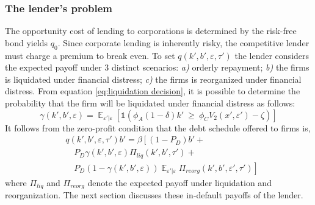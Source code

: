 \documentclass[12pt]{article}
\DeclareMathOperator{\E}{\mathbb{E}}
\begin{document}
\subsubsection{The lender's problem}
The opportunity cost of lending to corporations is determined by the risk-free bond yields $q_0$. Since corporate lending is inherently risky, the competitive lender must charge a premium to break even. To set $q(k',b',\varepsilon, \tau')$ the lender considers the expected payoff under 3 distinct scenarios: \textit{a)} orderly repayment; \textit{b)} the firms is liquidated under financial distress; \textit{c)} the firms is reorganized under financial distress. From equation \ref{eq:liquidation decision}, it is possible to determine the probability that the firm will be liquidated under financial distress as follows: 
\begin{equation} \label{eq:liquidation probability}
    \gamma(k',b',\varepsilon) = \E_{\varepsilon'|\varepsilon}[\mathds{1}(\phi_A (1-\delta) k'  \  \geq \ \phi_C V_2(x',\varepsilon')- \zeta)]  
\end{equation}
It follows from the zero-profit condition that the debt schedule offered to firms is,
\begin{equation} \label{eq:q}
    \begin{split}
        & q(k',b', \varepsilon, \tau')b' =  \beta \left[ (1-P_D)b' + \right. \\
        & \quad P_D \gamma(k',b',\varepsilon) \Pi_{liq}(k',b', \tau') +  \\
        & \quad \left. P_D (1-\gamma(k',b',\varepsilon)) \E_{\varepsilon'|\varepsilon} \Pi_{reorg}(k',b', \varepsilon', \tau') \right] 
    \end{split}
 \end{equation}
where $\Pi_{liq}$ and $\Pi_{reorg}$ denote the expected payoff under liquidation and reorganization. The next section discusses these in-default payoffs of the lender. 
\end{document}
